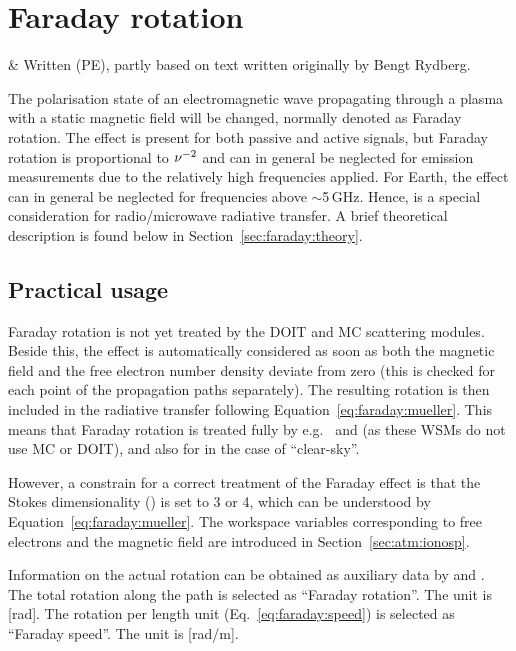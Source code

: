 \chapter{Faraday rotation}
 \label{sec:faraday}

 & Written (PE), partly based on text written originally by 
          Bengt Rydberg.
\stophistory

The polarisation state of an electromagnetic wave propagating through a plasma
with a static magnetic field will be changed, normally denoted as Faraday
rotation. The effect is present for both passive and active signals, but
Faraday rotation is proportional to $\nu^{-2}$ and can in general be neglected
for emission measurements due to the relatively high frequencies applied. For
Earth, the effect can in general be neglected for frequencies above
$\sim$5\,GHz. Hence,  is a special consideration
for radio/microwave radiative transfer. A brief theoretical description is
found below in Section~\ref{sec:faraday:theory}. 



\section{Practical usage}
\label{sec:faraday:arts}
%
Faraday rotation is not yet treated by the DOIT and MC scattering modules.
Beside this, the effect is automatically considered as soon as both the
magnetic field and the free electron number density deviate from zero (this is
checked for each point of the propagation paths separately). The resulting
rotation is then included in the radiative transfer following
Equation~\ref{eq:faraday:mueller}. This means that Faraday rotation is treated
fully by e.g.\  and
 (as these WSMs do not use MC or DOIT), and also for 
 in the case of ``clear-sky''. 

However, a constrain for a correct treatment of the Faraday effect is that the
Stokes dimensionality () is set to 3 or 4, which can be
understood by Equation~\ref{eq:faraday:mueller}. The workspace variables
corresponding to free electrons and the magnetic field are introduced in
Section~\ref{sec:atm:ionosp}.

Information on the actual rotation can be obtained as auxiliary data by
 and . The total
rotation along the path is selected as ``Faraday rotation''. The unit is [rad].
The rotation per length unit (Eq.~\ref{eq:faraday:speed}) is selected as
``Faraday speed''. The unit is [rad/m].




